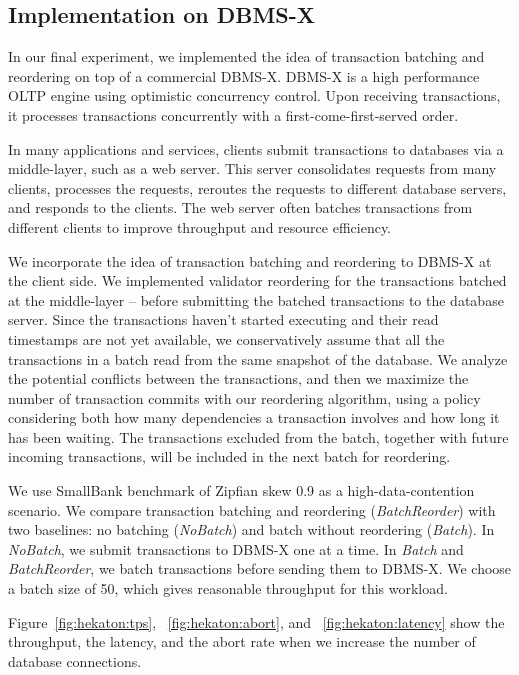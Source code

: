 \subsection{Implementation on DBMS-X}
\label{subsec:experiment:compare}

In our final experiment, we implemented the idea of transaction batching and reordering on top of a commercial DBMS-X. DBMS-X is a high performance OLTP engine using optimistic concurrency control. Upon receiving transactions, it processes transactions concurrently with a first-come-first-served order.

In many applications and services, clients submit transactions to databases via a middle-layer, such as a web server. This server consolidates requests from many clients, processes the requests, reroutes the requests to different database servers, and responds to the clients. The web server often batches transactions from different clients to improve throughput and resource efficiency. 

We incorporate the idea of transaction batching and reordering to DBMS-X at the client side.
We implemented validator reordering for the transactions batched at the middle-layer -- before submitting the batched transactions to the database server. Since the transactions haven't started executing and their read timestamps are not yet available, we conservatively assume that all the transactions in a batch read from the same snapshot of the database. We analyze the potential conflicts between the transactions, and then we maximize the number of transaction commits with our reordering algorithm, using a policy considering both how many dependencies a transaction involves and how long it has been waiting. The transactions excluded from the batch, together with future incoming transactions, will be included in the next batch for reordering.

We use SmallBank benchmark of Zipfian skew 0.9 as a high-data-contention scenario. We compare transaction batching and reordering (\emph{BatchReorder}) with two baselines: no batching (\emph{NoBatch}) and batch without reordering (\emph{Batch}). In \emph{NoBatch}, we submit transactions to DBMS-X one at a time. In \emph{Batch} and \emph{BatchReorder}, we batch transactions before sending them to DBMS-X. We choose a batch size of 50, which gives reasonable throughput for this workload.

Figure~\ref{fig:hekaton:tps}, ~\ref{fig:hekaton:abort}, and ~\ref{fig:hekaton:latency} show the throughput, the latency, and the abort rate when we increase the number of database connections. 


